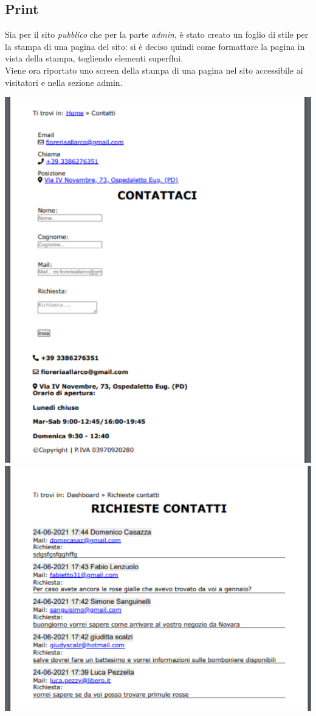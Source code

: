 \subsection{Print}
Sia per il sito \textit{pubblico} che per la parte \textit{admin}, è stato creato un foglio di stile per la stampa di una pagina del sito: si è deciso quindi come formattare la pagina in vista della stampa, togliendo elementi superflui.\\Viene ora riportato uno screen della stampa di una pagina nel sito accessibile ai visitatori e nella sezione admin.
\begin{center}
\includegraphics[width = 0.35 \textwidth]{../latex/images/clientprint.png}\hspace{5em}\includegraphics[width = 0.45 \textwidth]{../latex/images/adminprint.png}
\end{center}

